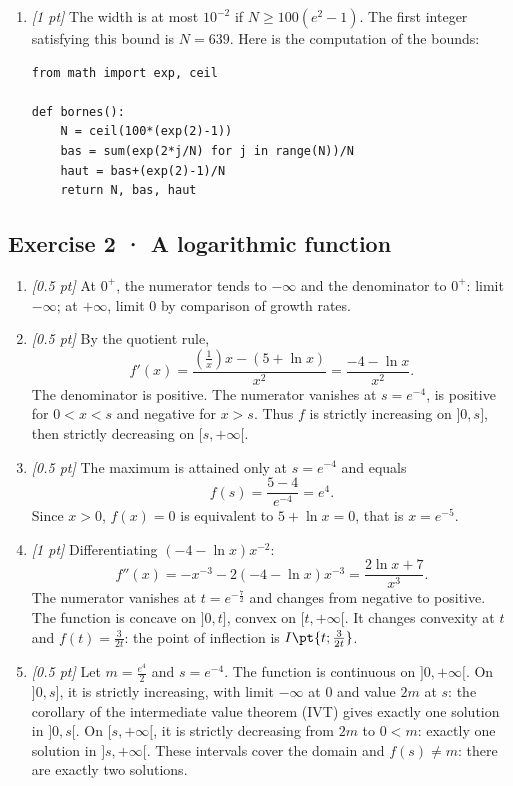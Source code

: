\begin{enumerate}

\item \textit{[1 pt]} The width is at most $10^{-2}$ if $N\ge100(e^{2}-1)$. The first integer satisfying this bound is $N=639$. Here is the computation of the bounds:
\begin{lstlisting}
from math import exp, ceil

def bornes():
    N = ceil(100*(exp(2)-1))
    bas = sum(exp(2*j/N) for j in range(N))/N
    haut = bas+(exp(2)-1)/N
    return N, bas, haut
\end{lstlisting}


\end{enumerate}

\subsection*{Exercise 2 · A logarithmic function}\begin{enumerate}

\item \textit{[0.5 pt]} At $0^+$, the numerator tends to $-\infty$ and the denominator to $0^+$: limit $-\infty$; at $+\infty$, limit $0$ by comparison of growth rates.

\item \textit{[0.5 pt]} By the quotient rule,
\[f'(x)=\frac{(\frac{1}{x})x-(5+\ln x)}{x^2}=\frac{-4-\ln x}{x^2}.\]
The denominator is positive. The numerator vanishes at $s=e^{-4}$, is positive for $0<x<s$ and negative for $x>s$. Thus $f$ is strictly increasing on $]0,s]$, then strictly decreasing on $[s,+\infty[$.

\item \textit{[0.5 pt]} The maximum is attained only at $s=e^{-4}$ and equals
\[f(s)=\frac{5- 4}{e^{-4}}=e^{4}.\]
Since $x>0$, $f(x)=0$ is equivalent to $5+\ln x=0$, that is $x=e^{-5}$.

\item \textit{[1 pt]} Differentiating $(-4-\ln x)x^{-2}$:
\[f''(x)=-x^{-3}-2(-4-\ln x)x^{-3}=\frac{2\ln x+7}{x^3}.\]
The numerator vanishes at $t=e^{-\frac{7}{2}}$ and changes from negative to positive. The function is concave on $]0,t]$, convex on $[t,+\infty[$. It changes convexity at $t$ and $f(t)=\frac{3}{2t}$: the point of inflection is $I\pt{t;\frac{3}{2t}}$.

\item \textit{[0.5 pt]} Let $m=\frac{e^{4}}{2}$ and $s=e^{-4}$. The function is continuous on $]0,+\infty[$. On $]0,s]$, it is strictly increasing, with limit $-\infty$ at $0$ and value $2m$ at $s$: the corollary of the intermediate value theorem (IVT) gives exactly one solution in $]0,s[$. On $[s,+\infty[$, it is strictly decreasing from $2m$ to $0<m$: exactly one solution in $]s,+\infty[$. These intervals cover the domain and $f(s)\ne m$: there are exactly two solutions.


\end{enumerate}
